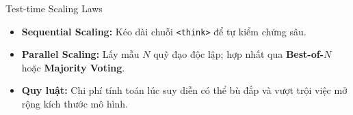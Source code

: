 \begin{frame}{Test-time Scaling Laws}
  \small
  \begin{itemize}\setlength{\itemsep}{6pt}
    \item \textbf{Sequential Scaling:} Kéo dài chuỗi \texttt{<think>} để tự kiểm chứng sâu.
    \item \textbf{Parallel Scaling:} Lấy mẫu $N$ quỹ đạo độc lập; hợp nhất qua \textbf{Best-of-$N$} hoặc \textbf{Majority Voting}.
    \item \textbf{Quy luật:} Chi phí tính toán lúc suy diễn có thể bù đắp và vượt trội việc mở rộng kích thước mô hình.
  \end{itemize}
  \par\vspace{0pt}
\end{frame}